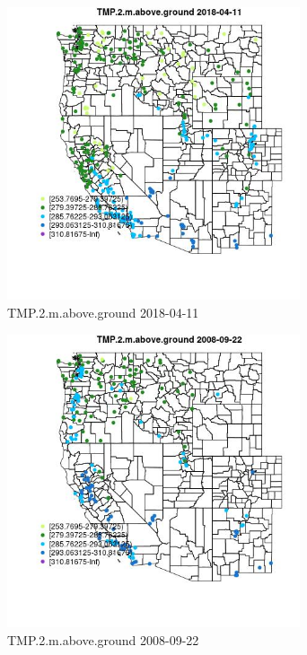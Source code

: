 \begin{figure} 
\centering  
\includegraphics[width=0.77\textwidth]{Code_Outputs/Report_ML_input_PM25_Step4_part_e_de_duplicated_aves_compiled_2019-05-18wNAs_MapObsTMP2maboveground2018-04-11.jpg} 
\caption{\label{fig:Report_ML_input_PM25_Step4_part_e_de_duplicated_aves_compiled_2019-05-18wNAsMapObsTMP2maboveground2018-04-11}TMP.2.m.above.ground 2018-04-11} 
\end{figure} 
 

\begin{figure} 
\centering  
\includegraphics[width=0.77\textwidth]{Code_Outputs/Report_ML_input_PM25_Step4_part_e_de_duplicated_aves_compiled_2019-05-18wNAs_MapObsTMP2maboveground2008-09-22.jpg} 
\caption{\label{fig:Report_ML_input_PM25_Step4_part_e_de_duplicated_aves_compiled_2019-05-18wNAsMapObsTMP2maboveground2008-09-22}TMP.2.m.above.ground 2008-09-22} 
\end{figure} 
 

